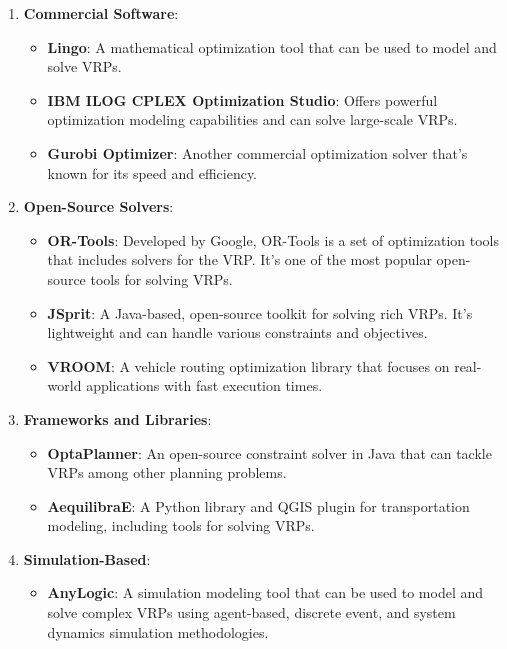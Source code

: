 \begin{enumerate}
    \item \textbf{Commercial Software}:
    \begin{itemize}
        \item \textbf{Lingo}: A mathematical optimization tool that can be used to model and solve VRPs.
        \item \textbf{IBM ILOG CPLEX Optimization Studio}: Offers powerful optimization modeling capabilities and can solve large-scale VRPs.
        \item \textbf{Gurobi Optimizer}: Another commercial optimization solver that's known for its speed and efficiency.
    \end{itemize}
    
    \item \textbf{Open-Source Solvers}:
    \begin{itemize}
        \item \textbf{OR-Tools}: Developed by Google, OR-Tools is a set of optimization tools that includes solvers for the VRP. It's one of the most popular open-source tools for solving VRPs.
        \item \textbf{JSprit}: A Java-based, open-source toolkit for solving rich VRPs. It's lightweight and can handle various constraints and objectives.
        \item \textbf{VROOM}: A vehicle routing optimization library that focuses on real-world applications with fast execution times.
    \end{itemize}
    
    \item \textbf{Frameworks and Libraries}:
    \begin{itemize}
        \item \textbf{OptaPlanner}: An open-source constraint solver in Java that can tackle VRPs among other planning problems.
        \item \textbf{AequilibraE}: A Python library and QGIS plugin for transportation modeling, including tools for solving VRPs.
    \end{itemize}
    
    \item \textbf{Simulation-Based}:
    \begin{itemize}
        \item \textbf{AnyLogic}: A simulation modeling tool that can be used to model and solve complex VRPs using agent-based, discrete event, and system dynamics simulation methodologies.
    \end{itemize}
    

\end{enumerate}
